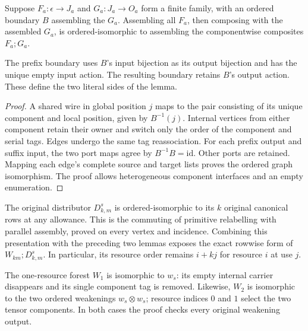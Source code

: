 \begin{lemma}
Suppose $F_a:\epsilon\to J_a$ and $G_a:J_a\to O_a$ form a finite family,
with an ordered boundary $B$ assembling the $G_a$. Assembling all $F_a$,
then composing with the assembled $G_a$, is ordered-isomorphic to assembling
the componentwise composites $F_a;G_a$.
\end{lemma}
The prefix boundary uses $B$'s input bijection as its output bijection and
has the unique empty input action. The resulting boundary retains $B$'s
output action. These define the two literal sides of the lemma.

\begin{proof}
A shared wire in global position $j$ maps to the pair consisting of its
unique component and local position, given by $B^{-1}(j)$. Internal vertices
from either component retain their owner and switch only the order of the
component and serial tags. Edges undergo the same tag reassociation.
For each prefix output and suffix input, the two port maps agree by
$B^{-1}B=\mathrm{id}$. Other ports are retained. Mapping each edge's complete
source and target lists proves the ordered graph isomorphism. The proof
allows heterogeneous component interfaces and an empty enumeration.
\end{proof}

The original distributor $D^s_{k,m}$ is ordered-isomorphic to its $k$ original
canonical rows at any allowance. This is the commuting of primitive relabelling
with parallel assembly, proved on every vertex and incidence. Combining this
presentation with the preceding two lemmas exposes the exact rowwise form of
$W_{km};D^s_{k,m}$. In particular, its resource order remains $i+kj$ for
resource $i$ at use $j$.

The one-resource forest $W_1$ is isomorphic to $w_s$: its empty internal
carrier disappears and its single component tag is removed. Likewise,
$W_2$ is isomorphic to the two ordered weakenings $w_s\otimes w_s$; resource
indices $0$ and $1$ select the two tensor components. In both cases the
proof checks every original weakening output.

